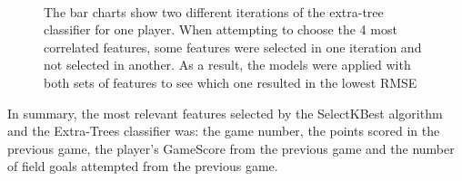 \documentclass[a4paper,11pt,twoside]{article}
\begin{document}
\begin{figure} [h!]
 \captionsetup{justification=centering}
\\
\caption{The bar charts show two different iterations of the extra-tree classifier for one player. When attempting to choose the 4 most correlated features, some features were selected in one iteration and not selected in another. As a result, the models were applied with both sets of features to see which one resulted in the lowest RMSE}
\end{figure}

In summary, the most relevant features selected by the SelectKBest algorithm and the Extra-Trees classifier was: the game number, the points scored in the previous game, the player's GameScore from the previous game and the number of field goals attempted from the previous game. 
\end{document}
